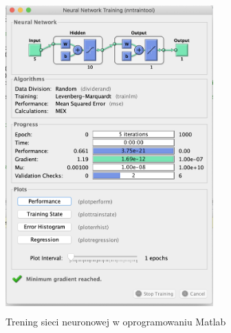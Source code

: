 \documentclass[a4paper,12pt]{article}
\begin{document}
\begin{justify}
\begin{figure}[h]
\centering
\includegraphics[width=8cm, height=12cm]{16}
\caption{Trening sieci neuronowej w oprogramowaniu Matlab}
\end{figure}

\newpage

\end{justify}
\end{document}
